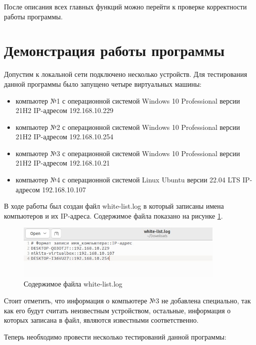 \documentclass[bachelor, och, coursework]{SCWorks}
\begin{document}
    После описания всех главных функций можно перейти к проверке корректности работы программы.

  \section{Демонстрация работы программы}
  Допустим к локальной сети подключено несколько устройств. Для тестирования данной программы было запущено четыре виртуальных машины:

  \begin{itemize}
    \item компьютер №1 с операционной системой Windows 10 Professional версии 21H2 IP-адресом 192.168.10.229
    \item компьютер №2 с операционной системой Windows 10 Professional версии 21H2 IP-адресом 192.168.10.254
    \item компьютер №3 с операционной системой Windows 10 Professional версии 21H2 IP-адресом 192.168.10.21
    \item компьютер №4 с операционной системой Linux Ubuntu версии 22.04 LTS IP-адресом 192.168.10.107
  \end{itemize}

  В ходе работы был создан файл white-list.log в который записаны имена компьютеров и их IP-адреса. Содержимое файла показано на
  рисунке \ref{white-list}.

  \begin{figure}[H]
    \centering
    \includegraphics[width=0.9\textwidth]{photo/white-list.png}
    \caption{Содержимое файла white-list.log}
    \label{white-list}
  \end{figure}
  
  Стоит отметить, что информация о компьютере №3 не добавлена специально, так как его будут считать неизвестным устройством, остальные,
  информация о которых записана в файл, являются известными соответственно.
  
  Теперь необходимо провести несколько тестирований данной программы:
\end{document}

